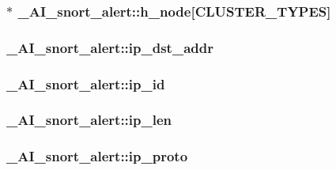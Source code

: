\label{struct__AI__snort__alert_a285aff12d6bac03c316ccc5305d28e53}
\hypertarget{struct__AI__snort__alert_ac53765584296ead1328eabfaba8a3aed}{
\subsubsection[{h\_\-node}]{$\ast$ {\bf \_\-AI\_\-snort\_\-alert::h\_\-node}\mbox{[}CLUSTER\_\-TYPES\mbox{]}}}
\label{struct__AI__snort__alert_ac53765584296ead1328eabfaba8a3aed}
\hypertarget{struct__AI__snort__alert_a754ca683593c838e4032fa8c13b1512b}{
\subsubsection[{ip\_\-dst\_\-addr}]{ {\bf \_\-AI\_\-snort\_\-alert::ip\_\-dst\_\-addr}}}
\label{struct__AI__snort__alert_a754ca683593c838e4032fa8c13b1512b}
\hypertarget{struct__AI__snort__alert_a2fc673dec85a7b49dd16ac7c0bb1bb78}{
\subsubsection[{ip\_\-id}]{ {\bf \_\-AI\_\-snort\_\-alert::ip\_\-id}}}
\label{struct__AI__snort__alert_a2fc673dec85a7b49dd16ac7c0bb1bb78}
\hypertarget{struct__AI__snort__alert_ad3ffe99036513d5f33b94d22fb84f8f1}{
\subsubsection[{ip\_\-len}]{ {\bf \_\-AI\_\-snort\_\-alert::ip\_\-len}}}
\label{struct__AI__snort__alert_ad3ffe99036513d5f33b94d22fb84f8f1}
\hypertarget{struct__AI__snort__alert_a5ea7b250ac1c472f3ab57565b6df2536}{
\subsubsection[{ip\_\-proto}]{ {\bf \_\-AI\_\-snort\_\-alert::ip\_\-proto}}}

